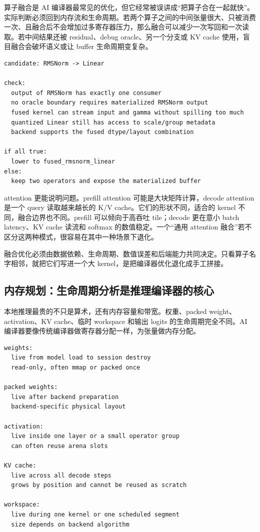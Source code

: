 算子融合是 AI 编译器最常见的优化，但它经常被误讲成“把算子合在一起就快”。实际判断必须回到内存流和生命周期。若两个算子之间的中间张量很大、只被消费一次、且融合后不会增加过多寄存器压力，那么融合可以减少一次写回和一次读取。若中间结果还被 residual、debug oracle、另一个分支或 KV cache 使用，盲目融合会破坏语义或让 buffer 生命周期变复杂。

\begin{lstlisting}[numbers=none,caption={融合决策要检查的事实}]
candidate: RMSNorm -> Linear

check:
  output of RMSNorm has exactly one consumer
  no oracle boundary requires materialized RMSNorm output
  fused kernel can stream input and gamma without spilling too much
  quantized Linear still has access to scale/group metadata
  backend supports the fused dtype/layout combination

if all true:
  lower to fused_rmsnorm_linear
else:
  keep two operators and expose the materialized buffer
\end{lstlisting}

attention 更能说明问题。prefill attention 可能是大块矩阵计算，decode attention 是一个 query 读取越来越长的 K/V cache。它们的形状不同，适合的 kernel 不同，融合边界也不同。prefill 可以倾向于高吞吐 tile；decode 更在意小 batch latency、KV cache 读流和 softmax 的数值稳定。一个“通用 attention 融合”若不区分这两种模式，很容易在其中一种场景下退化。

\begin{warningbox}
融合优化必须由数据依赖、生命周期、数值误差和后端能力共同决定。只看算子名字相邻，就把它们写进一个大 kernel，是把编译器优化退化成手工拼接。
\end{warningbox}

\subsection{内存规划：生命周期分析是推理编译器的核心}

本地推理最贵的不只是算术，还有内存容量和带宽。权重、packed weight、activation、KV cache、临时 workspace 和输出 logits 的生命周期完全不同。AI 编译器要像传统编译器做寄存器分配一样，为张量做内存分配。

\begin{lstlisting}[numbers=none,caption={张量生命周期的简化账本}]
weights:
  live from model load to session destroy
  read-only, often mmap or packed once

packed weights:
  live after backend preparation
  backend-specific physical layout

activation:
  live inside one layer or a small operator group
  can often reuse arena slots

KV cache:
  live across all decode steps
  grows by position and cannot be reused as scratch

workspace:
  live during one kernel or one scheduled segment
  size depends on backend algorithm
\end{lstlisting}

